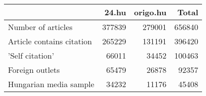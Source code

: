 \begin{tabular}{lrrr}
\toprule
{} &   24.hu &  origo.hu &   Total \\
\midrule
Number of articles        &  377839 &    279001 &  656840 \\
Article contains citation &  265229 &    131191 &  396420 \\
'Self citation'           &   66011 &     34452 &  100463 \\
Foreign outlets           &   65479 &     26878 &   92357 \\
Hungarian media sample    &   34232 &     11176 &   45408 \\
\bottomrule
\end{tabular}
